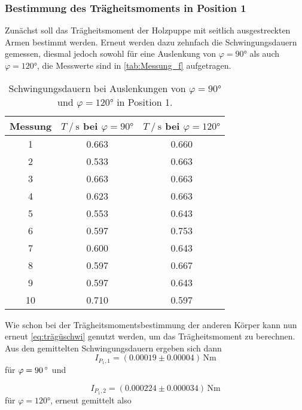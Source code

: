\subsubsection{Bestimmung des Trägheitsmoments in Position 1}
\label{subsubsec:pos1}
Zunächst soll das Trägheitsmoment der Holzpuppe mit seitlich ausgestreckten Armen bestimmt werden.
Erneut werden dazu zehnfach die Schwingungsdauern gemessen, diesmal jedoch sowohl für eine Auslenkung von $\varphi = 90 \unit{\degree}$ als auch $\varphi = 120 \unit{\degree}$,
die Messwerte sind in \autoref{tab:Messung_f} aufgetragen.

\begin{table}[H]
  \centering
  \begin{tabular}{S[table-format=2.0] S[table-format=1.3] S}
      \toprule
      {Messung} & {$T \mathbin{/} \unit{\second}$ bei $\varphi = 90 \unit{\degree}$} & {$T \mathbin{/} \unit{\second}$ bei $\varphi = 120 \unit{\degree}$}\\
       & 0.663 & 0.660 \\
      2 & 0.533 & 0.663 \\
      3 & 0.663 & 0.663 \\
      4 & 0.623 & 0.663 \\
      5 & 0.553 & 0.643 \\
      6 & 0.597 & 0.753 \\
      7 & 0.600 & 0.643 \\
      8 & 0.597 & 0.667 \\
      9 & 0.597 & 0.643 \\
      10& 0.710 & 0.597 \\
      \bottomrule
  \end{tabular}
  \caption{Schwingungsdauern bei Auslenkungen von $\varphi = 90 \unit{\degree}$ und $\varphi = 120 \unit{\degree}$ in Position 1.}
  \label{tab:Messung_f}
\end{table}

Wie schon bei der Trägheitsmomentsbestimmung der anderen Körper kann nun erneut \eqref{eq:trägüschwi} genutzt werden, um das Trägheitsmoment zu berechnen.
Aus den gemittelten Schwingungsdauern ergeben sich dann
\begin{equation*}
  I_{P_1,1} = (0.00019 \pm 0.00004) \, \unit{\newton\meter} 
\end{equation*} 
für $\varphi = 90 \, \unit{{\degree}}$ und

\begin{equation*}
  I_{P_1,2} = (0.000224 \pm 0.000034) \, \unit{\newton\meter} 
\end{equation*}
für $\varphi = 120 \unit{\degree}$, erneut gemittelt also

